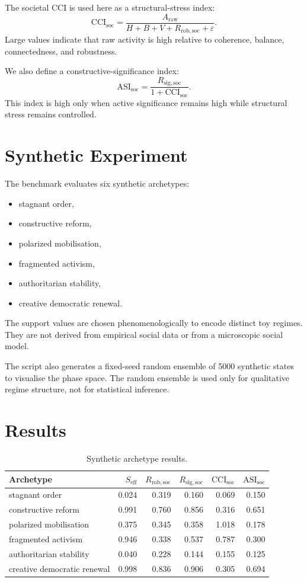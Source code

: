 \documentclass[11pt,a4paper]{article}
\newcommand{\CCIsoc}{\mathrm{CCI}_{\mathrm{soc}}}
\newcommand{\ASIsoc}{\mathrm{ASI}_{\mathrm{soc}}}
\newcommand{\Seff}{S_{\mathrm{eff}}}
\newcommand{\Rrob}{R_{\mathrm{rob,soc}}}
\newcommand{\Rsig}{R_{\mathrm{sig,soc}}}
\begin{document}
The societal CCI is used here as a structural-stress index:
\begin{equation}
\CCIsoc
=
\frac{
A_{\mathrm{raw}}
}{
H+B+V+\Rrob+\varepsilon
}.
\label{eq:ccisoc}
\end{equation}
Large values indicate that raw activity is high relative to coherence,
balance, connectedness, and robustness.

We also define a constructive-significance index:
\begin{equation}
\ASIsoc
=
\frac{\Rsig}{1+\CCIsoc}.
\label{eq:asisoc}
\end{equation}
This index is high only when active significance remains high while structural
stress remains controlled.

\section{Synthetic Experiment}

The benchmark evaluates six synthetic archetypes:
\begin{itemize}[leftmargin=1.5em]
\item stagnant order,
\item constructive reform,
\item polarized mobilisation,
\item fragmented activism,
\item authoritarian stability,
\item creative democratic renewal.
\end{itemize}
The support values are chosen phenomenologically to encode distinct toy
regimes.
They are not derived from empirical social data or from a microscopic social
model.

The script also generates a fixed-seed random ensemble of 5000 synthetic
states to visualise the phase space.
The random ensemble is used only for qualitative regime structure, not for
statistical inference.

\section{Results}

\begin{table}[H]
\centering
\caption{Synthetic archetype results.}
\begin{tabular}{lrrrrr}
\toprule
\textbf{Archetype} & $\Seff$ & $\Rrob$ & $\Rsig$ & $\CCIsoc$ & $\ASIsoc$ \\
\midrule
stagnant order & 0.024 & 0.319 & 0.160 & 0.069 & 0.150 \\
constructive reform & 0.991 & 0.760 & 0.856 & 0.316 & 0.651 \\
polarized mobilisation & 0.375 & 0.345 & 0.358 & 1.018 & 0.178 \\
fragmented activism & 0.946 & 0.338 & 0.537 & 0.787 & 0.300 \\
authoritarian stability & 0.040 & 0.228 & 0.144 & 0.155 & 0.125 \\
creative democratic renewal & 0.998 & 0.836 & 0.906 & 0.305 & 0.694 \\
\bottomrule
\end{tabular}
\end{table}
\end{document}
